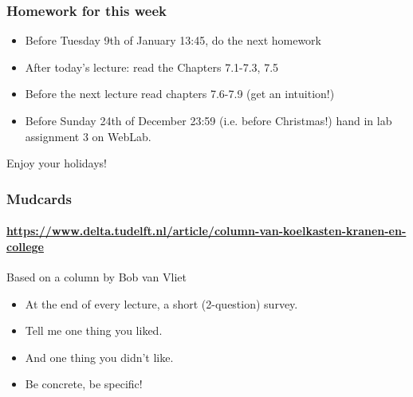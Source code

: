 
\begin{frame}
	\frametitle{Homework for this week}
	\begin{itemize}[<+->]
		\item \alert{Before} Tuesday 9th of January 13:45, do the next homework
		\item \alert{After} today's lecture: read the Chapters 7.1-7.3, 7.5
		\item \alert{Before} the next lecture read chapters 7.6-7.9 (get an intuition!)
		\item \alert{Before} Sunday 24th of December 23:59 (i.e. before Christmas!) hand in lab assignment 3 on WebLab.
	\end{itemize}
	\pause
	Enjoy your \alert{holidays}!
\end{frame}

\begin{frame}
	\frametitle{Mudcards}
	\framesubtitle{\url{https://www.delta.tudelft.nl/article/column-van-koelkasten-kranen-en-college}}

	\begin{block}{Based on a column by Bob van Vliet}
		\begin{itemize}
			\item At the end of every lecture, a short (2-question) survey.
			\item Tell me one thing you liked.
			\item And one thing you didn't like.
			\item Be concrete, be specific!
		\end{itemize}
	\end{block}
\end{frame}

